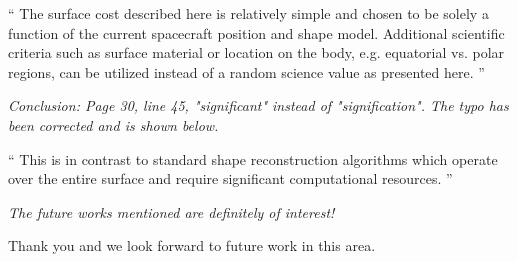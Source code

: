 \documentclass[11pt]{article}
\newenvironment{correction}{\begin{list}{}{\setlength{\leftmargin}{1cm}\setlength{\rightmargin}{1cm}}\vspace{\parsep}\item[]``}{''\end{list}}
\newcommand{\comment}[1]{\item \itshape #1 \normalfont}
\begin{document}
\begin{itemize}
\begin{correction}
    The surface cost described here is relatively simple and chosen to be solely a function of the current spacecraft position and shape model.
    Additional scientific criteria such as surface material or location on the body, e.g. equatorial vs. polar regions, can be utilized instead of a random science value as presented here.
\end{correction}

\comment{
Conclusion:
Page 30, line 45, "significant" instead of "signification".
}
The typo has been corrected and is shown below.

\begin{correction}
This is in contrast to standard shape reconstruction algorithms which operate over the entire surface and require significant computational resources.
\end{correction}

\comment{
The future works mentioned are definitely of interest!
}

Thank you and we look forward to future work in this area.

\end{itemize}




\end{document}
